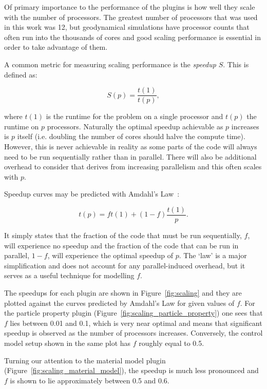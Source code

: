 Of primary importance to the performance of the plugins is how well they scale with the number of processors.
The greatest number of processors that was used in this work was \num{12}, but geodynamical simulations have processor counts that often run into the thousands of cores and good scaling performance is essential in order to take advantage of them.

A common metric for measuring scaling performance is the \textit{speedup} $S$. This is defined as:

\begin{equation*}
    S(p) = \frac{t(1)}{t(p)},
\end{equation*}

where $t(1)$ is the runtime for the problem on a single processor and $t(p)$ the runtime on $p$ processors. 
Naturally the optimal speedup achievable as $p$ increases is $p$ itself (i.e. doubling the number of cores should halve the compute time).
However, this is never achievable in reality as some parts of the code will always need to be run sequentially rather than in parallel.
There will also be additional overhead to consider that derives from increasing parallelism and this often scales with $p$.

Speedup curves may be predicted with Amdahl's Law~\parencite{amdahl_validity_1967}:

\begin{equation*}
    t(p) = f t(1) + (1 - f) \frac{t(1)}{p}.
\end{equation*}

It simply states that the fraction of the code that must be run sequentially, $f$, will experience no speedup and the fraction of the code that can be run in parallel, $1-f$, will experience the optimal speedup of $p$.
The `law' is a major simplification and does not account for any parallel-induced overhead, but it serves as a useful technique for modelling $f$.

The speedups for each plugin are shown in Figure~\ref{fig:scaling} and they are plotted against the curves predicted by Amdahl's Law for given values of $f$.
For the particle property plugin (Figure~\ref{fig:scaling_particle_property}) one sees that $f$ lies between \num{0.01} and \num{0.1}, which is very near optimal and means that significant speedup is observed as the number of processors increases.
Conversely, the control model setup shown in the same plot has $f$ roughly equal to \num{0.5}.

Turning our attention to the material model plugin (Figure~\ref{fig:scaling_material_model}), the speedup is much less pronounced and $f$ is shown to lie approximately between \num{0.5} and \num{0.6}.

